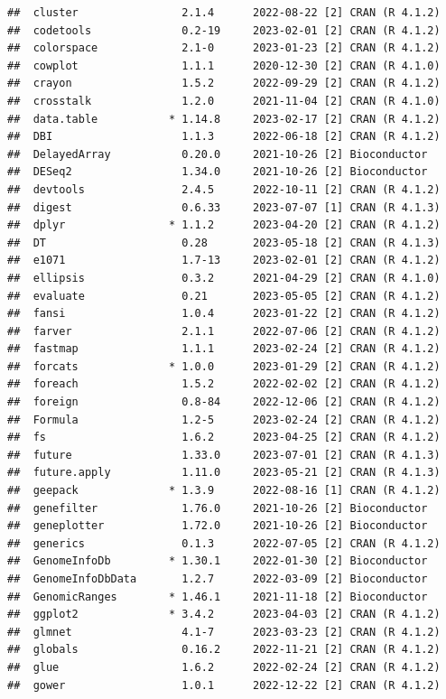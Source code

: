 \documentclass[
]{book}
\begin{document}
\begin{verbatim}
##  cluster                2.1.4      2022-08-22 [2] CRAN (R 4.1.2)
##  codetools              0.2-19     2023-02-01 [2] CRAN (R 4.1.2)
##  colorspace             2.1-0      2023-01-23 [2] CRAN (R 4.1.2)
##  cowplot                1.1.1      2020-12-30 [2] CRAN (R 4.1.0)
##  crayon                 1.5.2      2022-09-29 [2] CRAN (R 4.1.2)
##  crosstalk              1.2.0      2021-11-04 [2] CRAN (R 4.1.0)
##  data.table           * 1.14.8     2023-02-17 [2] CRAN (R 4.1.2)
##  DBI                    1.1.3      2022-06-18 [2] CRAN (R 4.1.2)
##  DelayedArray           0.20.0     2021-10-26 [2] Bioconductor
##  DESeq2                 1.34.0     2021-10-26 [2] Bioconductor
##  devtools               2.4.5      2022-10-11 [2] CRAN (R 4.1.2)
##  digest                 0.6.33     2023-07-07 [1] CRAN (R 4.1.3)
##  dplyr                * 1.1.2      2023-04-20 [2] CRAN (R 4.1.2)
##  DT                     0.28       2023-05-18 [2] CRAN (R 4.1.3)
##  e1071                  1.7-13     2023-02-01 [2] CRAN (R 4.1.2)
##  ellipsis               0.3.2      2021-04-29 [2] CRAN (R 4.1.0)
##  evaluate               0.21       2023-05-05 [2] CRAN (R 4.1.2)
##  fansi                  1.0.4      2023-01-22 [2] CRAN (R 4.1.2)
##  farver                 2.1.1      2022-07-06 [2] CRAN (R 4.1.2)
##  fastmap                1.1.1      2023-02-24 [2] CRAN (R 4.1.2)
##  forcats              * 1.0.0      2023-01-29 [2] CRAN (R 4.1.2)
##  foreach                1.5.2      2022-02-02 [2] CRAN (R 4.1.2)
##  foreign                0.8-84     2022-12-06 [2] CRAN (R 4.1.2)
##  Formula                1.2-5      2023-02-24 [2] CRAN (R 4.1.2)
##  fs                     1.6.2      2023-04-25 [2] CRAN (R 4.1.2)
##  future                 1.33.0     2023-07-01 [2] CRAN (R 4.1.3)
##  future.apply           1.11.0     2023-05-21 [2] CRAN (R 4.1.3)
##  geepack              * 1.3.9      2022-08-16 [1] CRAN (R 4.1.2)
##  genefilter             1.76.0     2021-10-26 [2] Bioconductor
##  geneplotter            1.72.0     2021-10-26 [2] Bioconductor
##  generics               0.1.3      2022-07-05 [2] CRAN (R 4.1.2)
##  GenomeInfoDb         * 1.30.1     2022-01-30 [2] Bioconductor
##  GenomeInfoDbData       1.2.7      2022-03-09 [2] Bioconductor
##  GenomicRanges        * 1.46.1     2021-11-18 [2] Bioconductor
##  ggplot2              * 3.4.2      2023-04-03 [2] CRAN (R 4.1.2)
##  glmnet                 4.1-7      2023-03-23 [2] CRAN (R 4.1.2)
##  globals                0.16.2     2022-11-21 [2] CRAN (R 4.1.2)
##  glue                   1.6.2      2022-02-24 [2] CRAN (R 4.1.2)
##  gower                  1.0.1      2022-12-22 [2] CRAN (R 4.1.2)

\end{verbatim}
\end{document}
